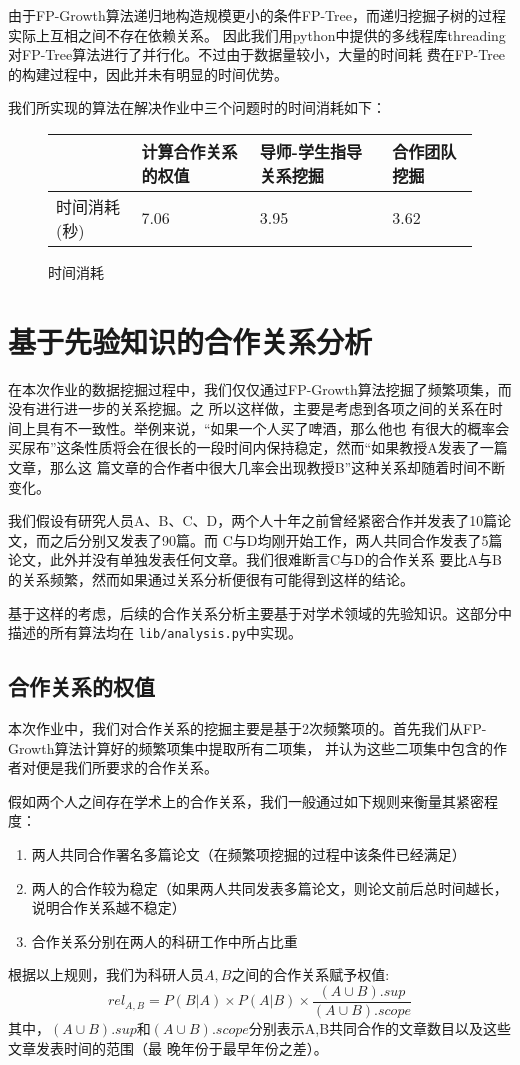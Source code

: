 \documentclass[a4paper]{article}
\begin{document}
由于FP-Growth算法递归地构造规模更小的条件FP-Tree，而递归挖掘子树的过程实际上互相之间不存在依赖关系。
因此我们用python中提供的多线程库threading对FP-Tree算法进行了并行化。不过由于数据量较小，大量的时间耗
费在FP-Tree的构建过程中，因此并未有明显的时间优势。

我们所实现的算法在解决作业中三个问题时的时间消耗如下：
\begin{figure}[ht]
  \begin{center}
    \begin{tabular}{llll}
      \hline
      & 计算合作关系的权值 & 导师-学生指导关系挖掘 & 合作团队挖掘 \\
      \hline
      时间消耗(秒) & 7.06 & 3.95 & 3.62 \\
      \hline
    \end{tabular}
  \end{center}
  \caption{时间消耗}
\end{figure}

\section{基于先验知识的合作关系分析} 
在本次作业的数据挖掘过程中，我们仅仅通过FP-Growth算法挖掘了频繁项集，而没有进行进一步的关系挖掘。之
所以这样做，主要是考虑到各项之间的关系在时间上具有不一致性。举例来说，``如果一个人买了啤酒，那么他也
有很大的概率会买尿布''这条性质将会在很长的一段时间内保持稳定，然而``如果教授A发表了一篇文章，那么这
篇文章的合作者中很大几率会出现教授B''这种关系却随着时间不断变化。

我们假设有研究人员A、B、C、D，两个人十年之前曾经紧密合作并发表了10篇论文，而之后分别又发表了90篇。而
C与D均刚开始工作，两人共同合作发表了5篇论文，此外并没有单独发表任何文章。我们很难断言C与D的合作关系
要比A与B的关系频繁，然而如果通过关系分析便很有可能得到这样的结论。

基于这样的考虑，后续的合作关系分析主要基于对学术领域的先验知识。这部分中描述的所有算法均在
\texttt{lib/analysis.py}中实现。

\subsection{合作关系的权值}
本次作业中，我们对合作关系的挖掘主要是基于2次频繁项的。首先我们从FP-Growth算法计算好的频繁项集中提取所有二项集，
并认为这些二项集中包含的作者对便是我们所要求的合作关系。

假如两个人之间存在学术上的合作关系，我们一般通过如下规则来衡量其紧密程度：
\begin{enumerate}
  \item 两人共同合作署名多篇论文（在频繁项挖掘的过程中该条件已经满足）
  \item 两人的合作较为稳定（如果两人共同发表多篇论文，则论文前后总时间越长，说明合作关系越不稳定）
  \item 合作关系分别在两人的科研工作中所占比重
\end{enumerate}
根据以上规则，我们为科研人员$A,B$之间的合作关系赋予权值:
\[
rel_{A,B}=P(B|A)\times P(A|B)\times \frac{(A\cup B).sup}{(A\cup B).scope}
\]
其中，$(A\cup B).sup$和$(A\cup B).scope$分别表示A,B共同合作的文章数目以及这些文章发表时间的范围（最
晚年份于最早年份之差）。
\end{document}
